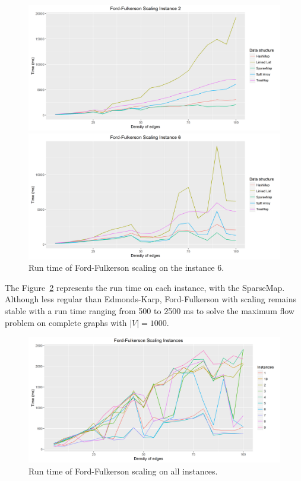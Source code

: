 \begin{figure}[H]
\includegraphics[scale=0.63]{images/FF2.png}
\caption{Run time of Ford-Fulkerson scaling on the instance 2.}
\label{fig:FF2}
\includegraphics[scale=0.63]{images/FF6.png}
\caption{Run time of Ford-Fulkerson scaling on the instance 6.}
\label{fig:FF6}
\end{figure}

The Figure~\ref{fig:FFmean} represents the run time on each instance, with the SparseMap. Although less regular than Edmonds-Karp, Ford-Fulkerson with scaling remains stable with a run time ranging from 500 to 2500 ms to solve the maximum flow problem on complete graphs with $|V|=1000$.

\begin{figure}[H]
\includegraphics[scale=0.65]{images/FFmean.png}
\caption{Run time of Ford-Fulkerson scaling on all instances.}
\label{fig:FFmean}
\end{figure}

